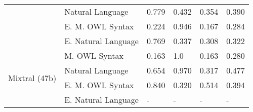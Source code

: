 \begin{table}[ht]
{\begin{tabular}{|l|l|l|l|l|l|}
 & Natural Language                               & 0.779 & 0.432 & 0.354 & 0.390 \\ \cline{2-6}
 & \cellcolor[HTML]{EFEFEF} E. M. OWL Syntax    & \cellcolor[HTML]{EFEFEF} 0.224 & \cellcolor[HTML]{EFEFEF} 0.946 & \cellcolor[HTML]{EFEFEF} 0.167 & \cellcolor[HTML]{EFEFEF} 0.284 \\ \cline{2-6}
 & E. Natural Language                            & 0.769 & 0.337 & 0.308 & 0.322 \\ \cline{1-6}
\hline
\multirow{4}{*}{Mixtral (47b)}
 & \cellcolor[HTML]{FFFF00} M. OWL Syntax       & \cellcolor[HTML]{FFFF00} 0.163 & \cellcolor[HTML]{FFFF00} 1.0 & \cellcolor[HTML]{FFFF00} 0.163 & \cellcolor[HTML]{FFFF00} 0.280 \\ \cline{2-6}
 & Natural Language                               & 0.654 & 0.970 & 0.317 & 0.477 \\ \cline{2-6}
 & \cellcolor[HTML]{EFEFEF} E. M. OWL Syntax    & \cellcolor[HTML]{EFEFEF} 0.840 & \cellcolor[HTML]{EFEFEF} 0.320 & \cellcolor[HTML]{EFEFEF} 0.514 & \cellcolor[HTML]{EFEFEF} 0.394 \\ \cline{2-6}
 & \cellcolor[HTML]{FF0000} E. Natural Language & \cellcolor[HTML]{FF0000} - & \cellcolor[HTML]{FF0000} - & \cellcolor[HTML]{FF0000} - & \cellcolor[HTML]{FF0000} - \\ \cline{1-6}
\hline
\end{tabular}
}
\end{table}
